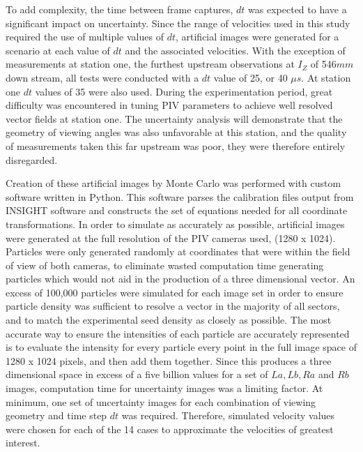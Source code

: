 To add complexity, the time between frame captures, $dt$ was expected to have a 
significant impact on uncertainty. Since the range of velocities used in this 
study required the use of multiple values of $dt$, artificial images were 
generated for a scenario at each value of $dt$ and the associated velocities. 
With the exception of measurements at station one, the furthest upstream 
observations at $I_Z$ of 546$mm$ down stream, all tests were conducted with a 
$dt$ value of 25, or 40 $\mu s$. At station one $dt$ values of 35 were also 
used. During the experimentation period, great difficulty 
was encountered in tuning PIV parameters to achieve well resolved vector fields 
at station one. The uncertainty analysis will demonstrate that the geometry of 
viewing angles was also unfavorable at this station, and the quality of 
measurements taken this far upstream was poor, they were therefore entirely 
disregarded. 

Creation of these artificial images by Monte Carlo was performed with custom 
software written in Python. This software parses the calibration files output 
from INSIGHT software and constructs the set of equations needed for all 
coordinate transformations. In order to simulate as accurately as possible, 
artificial images were generated at the full resolution of the PIV cameras 
used, (1280 x 1024). Particles were only generated randomly at coordinates 
that were within the field of view of both cameras, to eliminate wasted 
computation time generating particles which would not aid in the production of 
a three dimensional vector. An excess of 100,000 particles were simulated for 
each image set in order to ensure particle density was sufficient to resolve a 
vector in the majority of all sectors, and to match the experimental seed 
density as closely as possible. The most accurate way to ensure the intensities 
of each particle are accurately represented is to evaluate the intensity for 
every particle every point in the full image space of 1280 x 1024 pixels, and 
then add them together. Since this produces a three dimensional space in excess 
of a five billion values for a set of $La, Lb, Ra$ and $Rb$ images, computation 
time for uncertainty images was a limiting factor. At minimum, one set of 
uncertainty images for each combination of viewing geometry and time step $dt$ 
was required. Therefore, simulated velocity values were chosen for each of the 
14 cases to approximate the velocities of greatest interest. 

